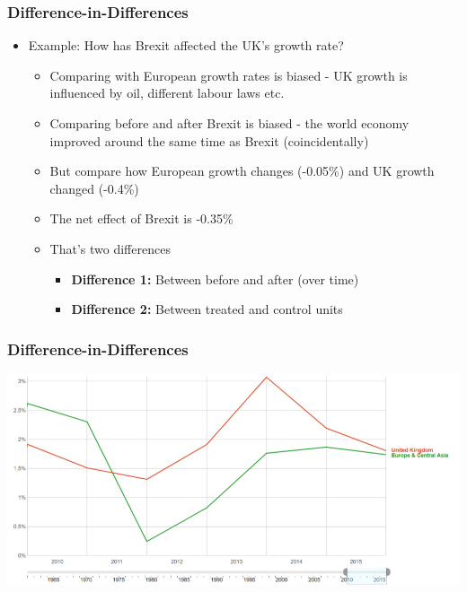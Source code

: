 \documentclass[xcolor=x11names,compress]{beamer}\usepackage[]{graphicx}\usepackage[]{xcolor}
\renewcommand{\(}{\begin{columns}}
\renewcommand{\)}{\end{columns}}
\newcommand{\<}[1]{\begin{column}{#1}}
\renewcommand{\>}{\end{column}}
\begin{document}
\begin{frame}
\frametitle{Difference-in-Differences}
\begin{itemize}
\item Example: How has Brexit affected the UK's growth rate?
\pause
\begin{itemize}
\item Comparing with European growth rates is biased - UK growth is influenced by oil, different labour laws etc.
\pause
\item Comparing before and after Brexit is biased - the world economy improved around the same time as Brexit (coincidentally)
\pause
\item But compare how European growth changes (-0.05\%) and UK growth changed (-0.4\%)
\pause
\item The net effect of Brexit is -0.35\%
\pause
\item That's two differences
\begin{itemize}
\item \textbf{Difference 1:} Between before and after (over time)
\item \textbf{Difference 2:} Between treated and control units
\pause
\end{itemize}
\end{itemize}
\end{itemize}
\end{frame}

\begin{frame}
\frametitle{Difference-in-Differences}
\begin{center}
\includegraphics[scale=0.3]{figure/UK_growth.png}
\end{center}
\end{frame}
\end{document}
